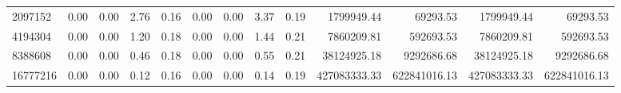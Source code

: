 \begin{tabular}{lrrrrrrrrrrrr}
2097152  &        0.00 &        0.00 &          2.76 &          0.16 &           0.00 &           0.00 &         3.37 &         0.19 &       1799949.44 &         69293.53 &      1799949.44 &        69293.53 \\
4194304  &        0.00 &        0.00 &          1.20 &          0.18 &           0.00 &           0.00 &         1.44 &         0.21 &       7860209.81 &        592693.53 &      7860209.81 &       592693.53 \\
8388608  &        0.00 &        0.00 &          0.46 &          0.18 &           0.00 &           0.00 &         0.55 &         0.21 &      38124925.18 &       9292686.68 &     38124925.18 &      9292686.68 \\
16777216 &        0.00 &        0.00 &          0.12 &          0.16 &           0.00 &           0.00 &         0.14 &         0.19 &     427083333.33 &     622841016.13 &    427083333.33 &    622841016.13 \\
\bottomrule
\end{tabular}
